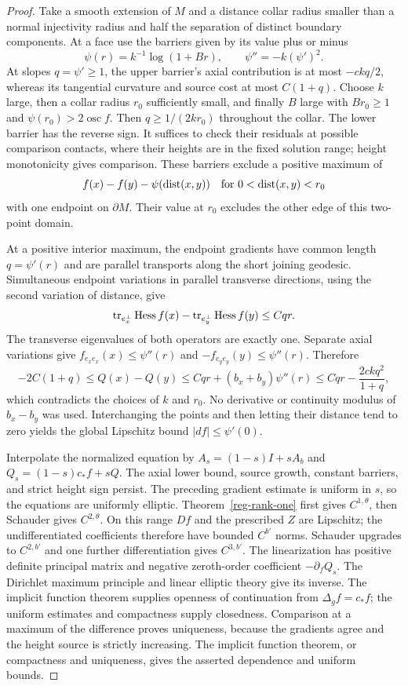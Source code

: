\begin{proof}
Take a smooth extension of $M$ and a distance collar radius smaller
than a normal injectivity radius and half the separation of
distinct boundary components.  At a face use the barriers given
by its value plus or minus
\[
 \psi(r)=k^{-1}\log(1+Br),\qquad \psi''=-k(\psi')^2.
\]
At slopes $q=\psi'\ge1$, the upper barrier's axial contribution
is at most $-ckq/2$, whereas its tangential curvature and source
cost at most $C(1+q)$.  Choose $k$ large, then a collar radius
$r_0$ sufficiently small, and finally $B$ large with $Br_0\ge1$
and $\psi(r_0)>2\operatorname{osc}f$.
Then $q\ge1/(2kr_0)$ throughout the collar.  The lower barrier
has the reverse sign.  It suffices to check their residuals at
possible comparison contacts, where their heights are in the
fixed solution range; height monotonicity gives comparison.
These barriers exclude a positive maximum of
\[
 f(x)-f(y)-\psi(\operatorname{dist}(x,y))
 \quad\hbox{for }0<\operatorname{dist}(x,y)<r_0
\]
with one endpoint on $\partial M$.  Their value at $r_0$ excludes
the other edge of this two-point domain.

At a positive interior maximum, the endpoint gradients have
common length $q=\psi'(r)$ and are parallel transports along the
short joining geodesic.  Simultaneous endpoint variations in
parallel transverse directions, using the second variation of
distance, give
\[
 \operatorname{tr}_{e_x^\perp}\operatorname{Hess} f(x)-
 \operatorname{tr}_{e_y^\perp}\operatorname{Hess} f(y)\le Cqr.
\]
The transverse eigenvalues of both operators are exactly one.
Separate axial variations give
$f_{e_xe_x}(x)\le\psi''(r)$ and
$-f_{e_ye_y}(y)\le\psi''(r)$.  Therefore
\[
 -2C(1+q)\le Q(x)-Q(y)
 \le Cqr+(b_x+b_y)\psi''(r)
 \le Cqr-\frac{2ckq^2}{1+q},
\]
which contradicts the choices of $k$ and $r_0$.  No derivative or
continuity modulus of $b_x-b_y$ was used.  Interchanging the
points and then letting their distance tend to zero yields the
global Lipschitz bound $|df|\le\psi'(0)$.

Interpolate the normalized equation by
$A_s=(1-s)I+sA_b$ and $Q_s=(1-s)c_*f+sQ$.
The axial lower bound, source growth, constant barriers, and
strict height sign persist.  The preceding gradient estimate is
uniform in $s$, so the equations are uniformly elliptic.
Theorem~\ref{reg-rank-one} first gives $C^{1,\theta}$, then
Schauder gives $C^{2,\theta}$.  On this range $Df$ and the
prescribed $Z$ are Lipschitz; the undifferentiated coefficients
therefore have bounded $C^{b'}$ norms.  Schauder upgrades to
$C^{2,b'}$ and one further differentiation gives $C^{3,b'}$.
The linearization has positive definite principal matrix and
negative zeroth-order coefficient $-\partial_fQ_s$.
The Dirichlet maximum principle and linear elliptic theory give
its inverse.  The implicit function theorem supplies openness
of continuation from $\Delta_g f=c_*f$; the uniform estimates
and compactness supply closedness.  Comparison at a maximum of
the difference proves uniqueness, because the gradients agree
and the height source is strictly increasing.  The implicit
function theorem, or compactness and uniqueness, gives the
asserted dependence and uniform bounds.
\end{proof}

